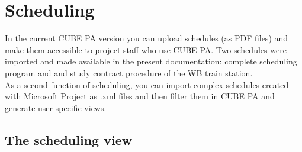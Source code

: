 
\pagebreak	
\section{Scheduling}
\label{bkm:Ref445400921}
In the current CUBE PA version you can upload schedules (as PDF files) and make them accessible to project staff who use CUBE PA. Two schedules were imported and made available in the present documentation: complete scheduling program and and study contract procedure of the WB train station. \\
As a second function of scheduling, you can import complex schedules created with Microsoft Project as .xml files and then filter them in CUBE PA and generate user-specific views.


\subsection{The scheduling view}

